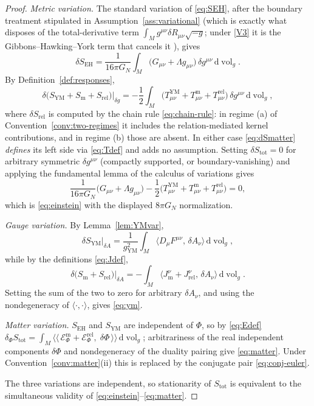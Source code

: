 \documentclass[11pt,a4paper]{article}
\theoremstyle{plain}
\theoremstyle{definition}
\theoremstyle{remark}
\newcommand{\dvol}{\mathrm{d}\!\operatorname{vol}_g}
\begin{document}
\begin{proof}
\emph{Metric variation.}
The standard variation of \eqref{eq:SEH}, after the boundary treatment stipulated in
Assumption~\ref{ass:variational} (which is exactly what disposes of the total-derivative term
$\int_M g^{\mu\nu}\delta R_{\mu\nu}\sqrt{-g}$; under \ref{V3} it is the Gibbons--Hawking--York term
that cancels it \cite{York1972,GibbonsHawking1977}), gives
\begin{equation}
\label{eq:dSEH}
\delta S_{\mathrm{EH}}
=\frac{1}{16\pi G_N}\int_M
\bigl(G_{\mu\nu}+\Lambda g_{\mu\nu}\bigr)\,\delta g^{\mu\nu}\,\dvol .
\end{equation}
By Definition~\ref{def:responses},
\begin{equation}
\label{eq:dSmatter}
\delta\bigl(S_{\mathrm{YM}}+S_{\mathrm{m}}+S_{\mathrm{rel}}\bigr)\Big|_{\delta g}
=-\frac12\int_M
\bigl(
T^{\mathrm{YM}}_{\mu\nu}+T^{\mathrm{m}}_{\mu\nu}+T^{\mathrm{rel}}_{\mu\nu}
\bigr)\,\delta g^{\mu\nu}\,\dvol ,
\end{equation}
where $\delta S_{\mathrm{rel}}$ is computed by the chain rule \eqref{eq:chain-rule}: in regime (a)
of Convention~\ref{conv:two-regimes} it includes the relation-mediated kernel contributions, and in
regime (b) those are absent. In either case \eqref{eq:dSmatter} \emph{defines} its left side via
\eqref{eq:Tdef} and adds no assumption. Setting $\delta S_{\mathrm{tot}}=0$ for arbitrary symmetric
$\delta g^{\mu\nu}$ (compactly supported, or boundary-vanishing) and applying the fundamental lemma
of the calculus of variations gives
\[
\frac{1}{16\pi G_N}\bigl(G_{\mu\nu}+\Lambda g_{\mu\nu}\bigr)
-\frac12\bigl(T^{\mathrm{YM}}_{\mu\nu}+T^{\mathrm{m}}_{\mu\nu}+T^{\mathrm{rel}}_{\mu\nu}\bigr)=0 ,
\]
which is \eqref{eq:einstein} with the displayed $8\pi G_N$ normalization.

\emph{Gauge variation.}
By Lemma~\ref{lem:YMvar},
\[
\delta S_{\mathrm{YM}}\big|_{\delta A}
=\frac{1}{g_{\mathrm{YM}}^{2}}\int_M
\bigl\langle D_\mu F^{\mu\nu},\,\delta A_\nu\bigr\rangle\,\dvol ,
\]
while by the definitions \eqref{eq:Jdef},
\[
\delta\bigl(S_{\mathrm{m}}+S_{\mathrm{rel}}\bigr)\big|_{\delta A}
=-\int_M\bigl\langle J^{\nu}_{\mathrm{m}}+J^{\nu}_{\mathrm{rel}},\,
\delta A_\nu\bigr\rangle\,\dvol .
\]
Setting the sum of the two to zero for arbitrary $\delta A_\nu$, and using the nondegeneracy of
$\langle\cdot,\cdot\rangle$, gives \eqref{eq:ym}.

\emph{Matter variation.}
$S_{\mathrm{EH}}$ and $S_{\mathrm{YM}}$ are independent of $\Phi$, so by \eqref{eq:Edef}
$\delta_\Phi S_{\mathrm{tot}}
=\int_M \langle\!\langle\,\mathcal{E}^{\mathrm{m}}_\Phi+\mathcal{E}^{\mathrm{rel}}_\Phi,\;
\delta\Phi\,\rangle\!\rangle\,\dvol$; arbitrariness of the real independent components $\delta\Phi$
and nondegeneracy of the duality pairing give \eqref{eq:matter}. Under
Convention~\ref{conv:matter}(ii) this is replaced by the conjugate pair \eqref{eq:conj-euler}.

The three variations are independent, so stationarity of $S_{\mathrm{tot}}$ is equivalent to the
simultaneous validity of \eqref{eq:einstein}--\eqref{eq:matter}.
\end{proof}
\end{document}
